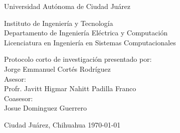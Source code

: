 \begin{center}
\vfill
{\Large Universidad Autónoma de Ciudad Juárez}\\
\vspace{6mm}
{\large 
Instituto de Ingeniería y Tecnología\\
\vspace{6mm}
Departamento de Ingeniería Eléctrica y Computación\\
\vspace{6mm}
Licenciatura en Ingeniería en Sistemas Computacionales\\
\vspace{20mm}

\vspace{10mm}






\vspace{15mm}


Protocolo corto de investigación presentado por:\\
\vspace{10mm}
Jorge Emmanuel Cortés Rodríguez\\
Asesor:\\
Profr. Javitt Higmar Nahitt Padilla Franco\\
\vspace{6mm}
Coasesor:\\
Josue Dominguez Guerrero\\
} 
\vfill
Ciudad Juárez, Chihuahua \hspace{40mm}\today

\end{center}
